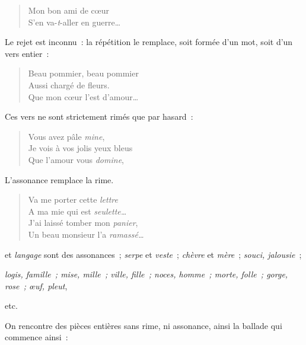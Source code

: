 \documentclass[french,twoside]{book} %
\begin{document}
\begin{verse}
Mon bon ami de cœur\\
S’en va-{\itshape t}-aller en guerre…\\
\end{verse}

\noindent Le rejet est inconnu : la répétition le remplace, soit formée d’un mot, soit d’un vers entier :\par


\begin{verse}
Beau pommier, beau pommier\\
Aussi chargé de fleurs.\\
Que mon cœur l’est d’amour…\\
\end{verse}

\noindent Ces vers ne sont strictement rimés que par hasard :\par


\begin{verse}
Vous avez pâle {\itshape mine},\\
Je vois à vos jolis yeux bleus\\
Que l’amour vous {\itshape domine},\\
\end{verse}

\noindent L’assonance remplace la rime.\par


\begin{verse}
Va me porter cette {\itshape lettre}\\
A ma mie qui est {\itshape seulette…}\\
J’ai laissé tomber mon {\itshape panier},\\
Un beau monsieur l’a {\itshape ramassé…}\\
\end{verse}

 et {\itshape langage} sont des assonances ; {\itshape serpe} et {\itshape veste} ; {\itshape chèvre} et {\itshape mère} ; {\itshape souci, jalousie} ;\par
{\itshape logis, famille ; mise, mille ; ville, fille ; noces, homme ; morte, folle ; gorge, rose ; œuf, pleut},\par
etc.\par
\par
On rencontre des pièces entières sans rime, ni assonance, ainsi la ballade qui commence ainsi :\par
\end{document}
